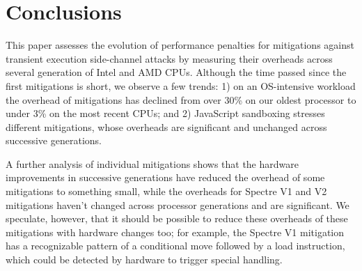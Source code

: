 \section{Conclusions}
\label{s:concl}

This paper assesses the evolution of performance penalties for
mitigations against transient execution side-channel attacks by
measuring their overheads across several generation of Intel and AMD
CPUs. Although the time passed since the first mitigations is short,
we observe a few trends: 1) on an OS-intensive workload the
overhead of mitigations has declined from over 30\% on our oldest
processor to under 3\% on the most recent CPUs; and 2) JavaScript
sandboxing stresses different mitigations, whose overheads are
significant and unchanged across successive generations.

A further analysis of individual mitigations shows that the hardware
improvements in successive generations have reduced the overhead of
some mitigations to something small, while the overheads for Spectre
V1 and V2 mitigations haven't changed across processor generations and
are significant.  We speculate, however, that it should be possible to
reduce these overheads of these mitigations with hardware changes too;
for example, the Spectre V1 mitigation has a recognizable pattern of a
conditional move followed by a load instruction, which could be
detected by hardware to trigger special handling.

